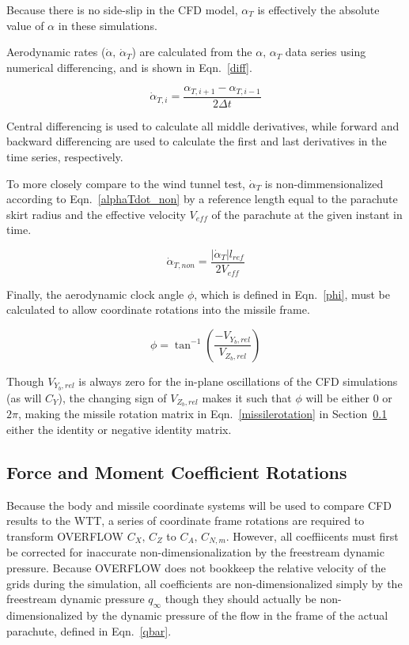 \documentclass[]{aiaa-tc}%
\begin{document}
\noindent Because there is no side-slip in the CFD model, $\alpha_T$ is effectively the absolute value of $\alpha$ in these simulations.

Aerodynamic rates ($\dot{\alpha},\,\dot{\alpha}_T$) are calculated from the $\alpha,\,\alpha_T$ data series using numerical differencing, and is shown in Eqn.~\ref{diff}.

\begin{equation} \label{diff}
 \dot{\alpha}_{T,i} = \frac{\alpha_{T,i+1} - \alpha_{T,i-1}}{2\Delta t}
\end{equation}

\noindent Central differencing is used to calculate all middle derivatives, while forward and backward differencing are used to calculate the first and last derivatives in the time series, respectively.

To more closely compare to the wind tunnel test, $\dot{\alpha}_T$ is non-dimmensionalized according to Eqn.~\ref{alphaTdot_non} by a reference length equal to the parachute skirt radius and the effective velocity $V_{eff}$ of the parachute at the given instant in time.

\begin{equation} \label{alphaTdot_non}
 \dot{\alpha}_{T,non} = \frac{|\dot{\alpha}_T| l_{ref}}{2V_{eff}}
\end{equation}

Finally, the aerodynamic clock angle $\phi$, which is defined in Eqn.~\ref{phi}, must be calculated to allow coordinate rotations into the missile frame.

\begin{equation} \label{phi}
\phi=\tan^{-1}(\frac{-V_{Y_b,rel}}{V_{Z_b,rel}})
\end{equation}

\noindent Though $V_{Y_b,rel}$ is always zero for the in-plane oscillations of the CFD simulations (as will $C_Y$), the changing sign of $V_{Z_b,rel}$ makes it such that $\phi$ will be either $0$ or $2\pi$, making the missile rotation matrix in Eqn.~\ref{missilerotation} in Section~\ref{rotations} either the identity or negative identity matrix.

\subsection{Force and Moment Coefficient Rotations} \label{rotations}

Because the body and missile coordinate systems will be used to compare CFD results to the WTT, a series of coordinate frame rotations are required to transform OVERFLOW $C_X,\,C_Z$ to $C_A,\,C_{N,m}$.  However, all coeffiicents must first be corrected for inaccurate non-dimensionalization by the freestream dynamic pressure.  Because OVERFLOW does not bookkeep the relative velocity of the grids during the simulation, all coefficients are non-dimensionalized simply by the freestream dynamic pressure $q_{\infty}$ though they should actually be non-dimensionalized by the dynamic pressure of the flow in the frame of the actual parachute, defined in Eqn.~\ref{qbar}.
\end{document}
